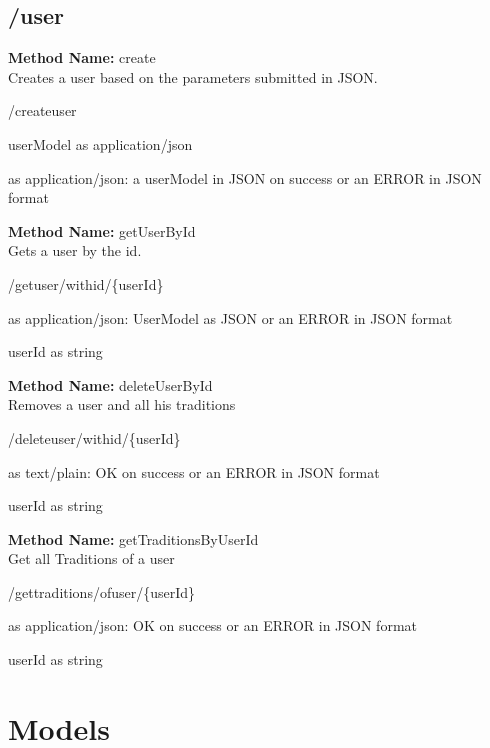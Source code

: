\section{/user}
\textbf{Method Name: }create \\ Creates a user based on the parameters submitted in JSON.
\begin{post}
/createuser
\end{post}
\begin{request}
userModel as application/json
\end{request}
\begin{response}
 as application/json: a userModel in JSON on success or an ERROR in JSON format
\end{response}
\textbf{Method Name: }getUserById \\ Gets a user by the id.
\begin{get}
/getuser/withid/\{userId\}
\end{get}
\begin{response}
 as application/json: UserModel as JSON or an ERROR in JSON format
\end{response}
\begin{parameter}
userId as string
\end{parameter}
\textbf{Method Name: }deleteUserById \\ Removes a user and all his traditions
\begin{delete}
/deleteuser/withid/\{userId\}
\end{delete}
\begin{response}
 as text/plain: OK on success or an ERROR in JSON format
\end{response}
\begin{parameter}
userId as string
\end{parameter}
\textbf{Method Name: }getTraditionsByUserId \\ Get all Traditions of a user
\begin{get}
/gettraditions/ofuser/\{userId\}
\end{get}
\begin{response}
 as application/json: OK on success or an ERROR in JSON format
\end{response}
\begin{parameter}
userId as string
\end{parameter}
\chapter{Models}
